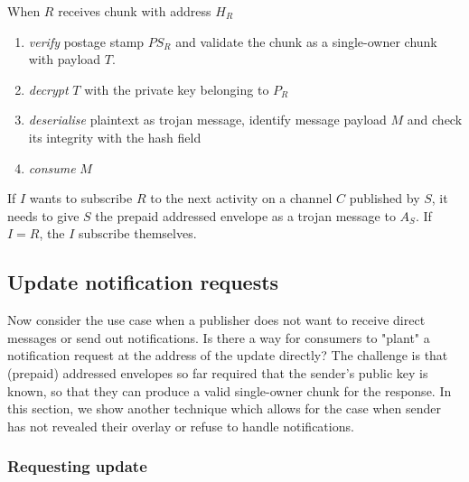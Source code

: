 When $R$ receives chunk with address $H_R$

\begin{enumerate}
    \item \emph{verify} postage stamp $PS_R$ and validate the chunk as a single-owner chunk with payload $T$.
    \item \emph{decrypt} $T$ with the private key belonging to $P_R$
    \item \emph{deserialise} plaintext as trojan message, identify message payload $M$ and check its integrity with the hash field
    \item \emph{consume} $M$
\end{enumerate}

If $I$ wants to subscribe $R$ to the next activity on a channel $C$ published by $S$, it needs to give $S$ the prepaid addressed envelope as a trojan message to $A_S$.
If $I=R$, the $I$ subscribe themselves.

\subsection{Update notification requests}\label{sec:update-notification-requests} 

Now consider the use case when a publisher does not want to receive direct messages or send out notifications. Is there a way for consumers to "plant" a notification request at the address of the update directly? The challenge is that (prepaid) addressed envelopes so far required that the sender's public key is known, so that they can produce a valid single-owner chunk for the response. In this section, we show another technique which allows for the case when sender has not revealed their overlay or refuse to handle notifications.                                                                                                                                                                                                                               
\subsubsection{Requesting update} 

